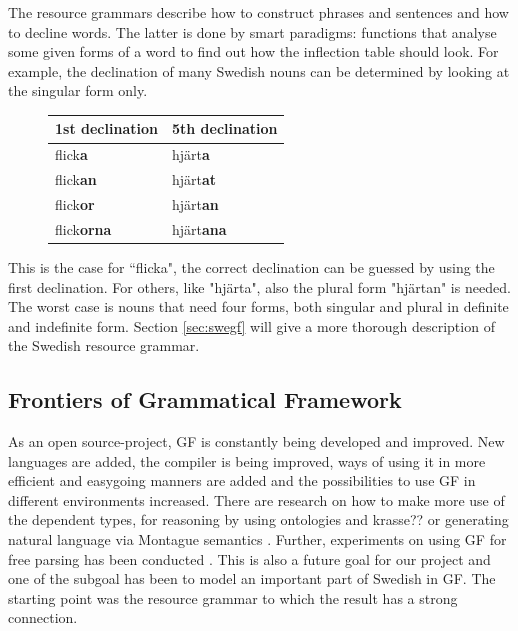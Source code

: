 \documentclass{report}
\begin{document}
The resource grammars describe how to construct phrases and sentences and how to
decline words. The latter is done by smart paradigms: functions that analyse
some given forms of a word to find out how the inflection table should look.
For example, the declination of many Swedish nouns can be determined by looking
at the singular form only. 
\begin{figure}
\begin{tabular}{| l | l |}
\hline
1st declination & 5th declination \\
\hline
flick\textbf{a}    &     hjärt\textbf{a}   \\
flick\textbf{an}    &    hjärt\textbf{at}  \\
flick\textbf{or}    &    hjärt\textbf{an}  \\
flick\textbf{orna}  &    hjärt\textbf{ana} \\
\hline
\end{tabular}
\end{figure}
This is the case for ``flicka", the correct declination
can be guessed by using the first declination. %
For others, like "hjärta", also the plural form "hjärtan" is needed.
The worst case is nouns that need four forms, both singular and
plural in definite and indefinite form.
Section \ref{sec:swegf} will give a more thorough description of the Swedish resource grammar.

\subsection{Frontiers of Grammatical Framework}
As an open source-project, GF is constantly being developed and improved. New
languages are added, the compiler is being improved, ways of using it in more 
efficient and easygoing manners are added
and the possibilities to use GF in different environments
increased. There are research on how to make more use of the dependent
types, for reasoning by using ontologies \cite{ramona}and krasse?? or generating natural
language via Montague semantics \cite{montague}.
Further, experiments on using GF for free parsing has been conducted
\cite[]{gfMech}.
This is also a future goal for our project and one of the subgoal has been to
model an important part of Swedish in GF. The starting point was the resource
grammar to which the result has a strong connection.
\end{document}
